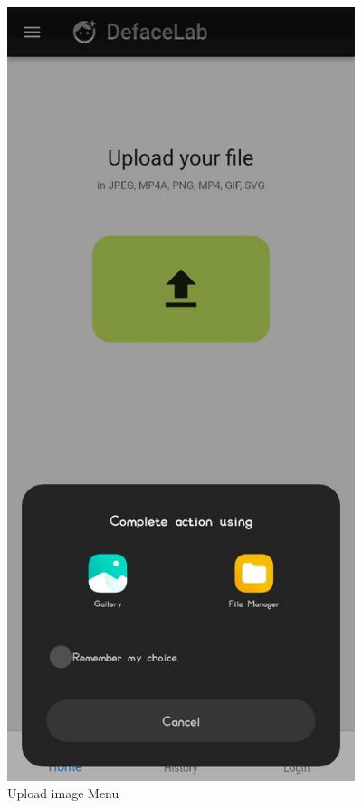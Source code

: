 \begin{figure}[ht]
    \centering
    \includegraphics[width= 4in,height =8 in ]{img/uploader.jpg}
    \caption{Upload image Menu}
\end{figure}